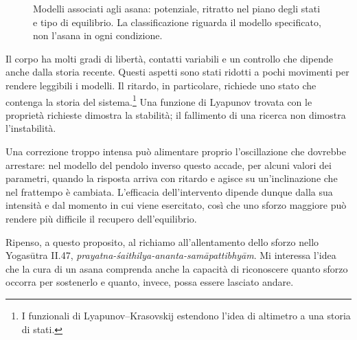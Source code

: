 \documentclass[11pt]{article}
\newcommand{\pittUrdhva}[1][]{%
  \begin{scope}[#1]
    \draw[corpo] (-0.14,0) -- (0.02,0);
    \draw[corpo] (0,0) -- (0.10,0.78);
    \draw[corpo] (0.10,0.78) .. controls (0.30,1.10) and (0.62,1.16) .. (0.86,1.02);
    \draw[corpo] (0.86,1.02) -- (1.22,0.58) -- (1.26,0) -- (1.48,0);
    \fill[testa] (0.24,0.55) circle (0.14);
  \end{scope}}
\begin{document}
\begin{figure}[htbp]
{%
}
\caption{Modelli associati agli asana: potenziale, ritratto nel piano degli stati e tipo di equilibrio. La classificazione riguarda il modello specificato, non l’asana in ogni condizione.}
\label{fig:riepilogo}
\end{figure}

Il corpo ha molti gradi di libertà, contatti variabili e un controllo che dipende anche dalla storia recente. Questi aspetti sono stati ridotti a pochi movimenti per rendere leggibili i modelli. Il ritardo, in particolare, richiede uno stato che contenga la storia del sistema.\footnote{I funzionali di Lyapunov--Krasovskij estendono l'idea di altimetro a una storia di stati.} Una funzione di Lyapunov trovata con le proprietà richieste dimostra la stabilità; il fallimento di una ricerca non dimostra l'instabilità.

Una correzione troppo intensa può alimentare proprio l'oscillazione che dovrebbe arrestare: nel modello del pendolo inverso questo accade, per alcuni valori dei parametri, quando la risposta arriva con ritardo e agisce su un'inclinazione che nel frattempo è cambiata. L'efficacia dell'intervento dipende dunque dalla sua intensità e dal momento in cui viene esercitato, così che uno sforzo maggiore può rendere più difficile il recupero dell'equilibrio.

Ripenso, a questo proposito, al richiamo all'allentamento dello sforzo nello Yogasūtra II.47, \emph{prayatna-śaithilya-ananta-samāpattibhyām}. Mi interessa l'idea che la cura di un asana comprenda anche la capacità di riconoscere quanto sforzo occorra per sostenerlo e quanto, invece, possa essere lasciato andare.
\end{document}
